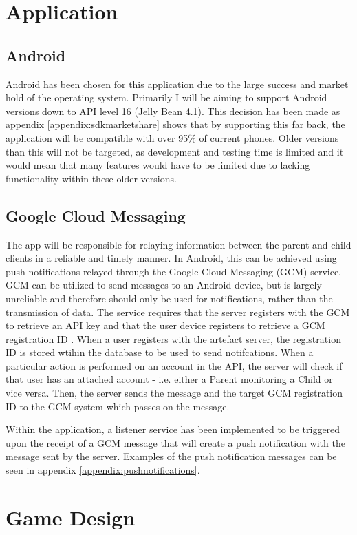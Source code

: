 \section{Application}
\subsection{Android}
Android has been chosen for this application due to the large success and market hold of the operating system.
Primarily I will be aiming to support Android versions down to API level 16 (Jelly Bean 4.1).
This decision has been made as appendix \ref{appendix:sdkmarketshare} shows that by supporting this far back, the application will be compatible with over 95\% of current phones. 
Older versions than this will not be targeted, as development and testing time is limited and it would mean that many features would have to be limited due to lacking functionality within these older versions.

\subsection{Google Cloud Messaging}
The app will be responsible for relaying information between the parent and child clients in a reliable and timely manner.
In Android, this can be achieved using push notifications relayed through the Google Cloud Messaging (GCM) service.
GCM can be utilized to send messages to an Android device, but is largely unreliable \citep{gcmreliability} and therefore should only be used for notifications, rather than the transmission of data.
The service requires that the server registers with the GCM to retrieve an API key and that the user device registers to retrieve a GCM registration ID \citep{gcm}. 
When a user registers with the artefact server, the registration ID is stored wtihin the database to be used to send notifcations.
When a particular action is performed on an account in the API, the server will check if that user has an attached account - i.e. either a Parent monitoring a Child or vice versa.
Then, the server sends the message and the target GCM registration ID to the GCM system which passes on the message.

Within the application, a listener service has been implemented to be triggered upon the receipt of a GCM message that will create a push notification with the message sent by the server.
Examples of the push notification messages can be seen in appendix \ref{appendix:pushnotifications}.

\section{Game Design}
